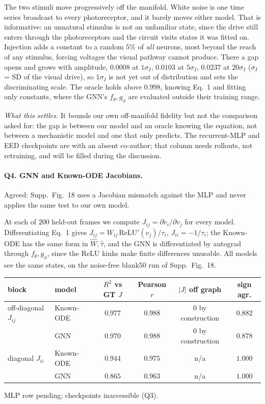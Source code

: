 \documentclass[11pt]{article}
\begin{document}
The two stimuli move progressively off the manifold. White noise is one time
series broadcast to every photoreceptor, and it barely moves either model. That
is informative: an unnatural stimulus is not an unfamiliar state, since the drive
still enters through the photoreceptors and the circuit visits states it was
fitted on. Injection adds a constant to a random $5\%$ of \emph{all} neurons,
most beyond the reach of any stimulus, forcing voltages the visual pathway cannot
produce. There a gap opens and grows with amplitude, $0.0008$ at $1\sigma_I$,
$0.0103$ at $5\sigma_I$, $0.0237$ at $20\sigma_I$ ($\sigma_I$ = SD of the visual
drive), so $1\sigma_I$ is not yet out of distribution and sets the discriminating
scale. The oracle holds above $0.998$, knowing Eq.~1 and fitting only constants,
where the GNN's $f_\theta, g_\phi$ are evaluated outside their training range.

\emph{What this settles.} It bounds our own off-manifold fidelity but not the
comparison asked for: the gap is between our model and an oracle knowing the
equation, not between a mechanistic model and one that only predicts. The
recurrent-MLP and EED checkpoints are with an absent co-author; that column needs
rollouts, not retraining, and will be filled during the discussion.

\paragraph{Q4. GNN and Known-ODE Jacobians.}
Agreed: Supp.~Fig.~18 uses a Jacobian mismatch against the MLP and never
applies the same test to our own model.

At each of $200$ held-out frames we compute
$J_{ij} = \partial \dot v_i / \partial v_j$ for every model. Differentiating
Eq.~1 gives $J_{ij} = W_{ij}\,\mathrm{ReLU}'(v_j)/\tau_i$, $J_{ii} = -1/\tau_i$;
the Known-ODE has the same form in $\widehat W, \hat\tau$, and the GNN is
differentiated by autograd through $f_\theta, g_\phi$, since the ReLU kinks make
finite differences unusable. All models see the same states, on the noise-free
blank50 run of Supp.~Fig.~18.
\label{link7}
\begin{center}
{\footnotesize
\begin{tabular}{llcccc}
\toprule
block & model & $R^2$ vs GT $J$ & Pearson $r$ & $|J|$ off graph & sign agr. \\
\midrule
off-diagonal $J_{ij}$ & Known-ODE & $0.977$ & $0.988$ & $0$ by construction & $0.882$ \\
                      & GNN       & $0.970$ & $0.988$ & $0$ by construction & $0.878$ \\
\midrule
diagonal $J_{ii}$     & Known-ODE & $0.944$ & $0.975$ & n/a                 & $1.000$ \\
                      & GNN       & $0.865$ & $0.963$ & n/a                 & $1.000$ \\
\bottomrule
\end{tabular}}

{\footnotesize MLP row pending; checkpoints inaccessible (Q3).}
\end{center}
\end{document}

